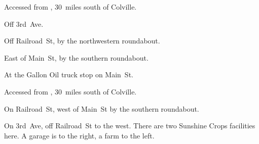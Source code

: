 
\begin{LocationList}

Accessed from , 30~miles south of Colville.

Off  3rd~Ave.

Off Railroad~St, by the northwestern roundabout.

East of  Main~St, by the southern roundabout.

At the Gallon Oil truck stop on   Main~St.

Accessed from , 30~miles south of Colville.

On Railroad~St, west of  Main~St by the southern roundabout.

On 3rd~Ave, off Railroad~St to the west.
There are two Sunshine Crops facilities here.
A garage is to the right, a farm to the left.

\end{LocationList}
